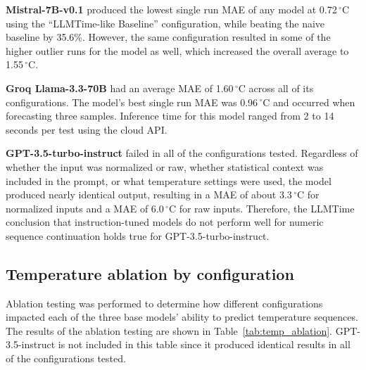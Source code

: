 \documentclass[11pt,a4paper]{article}
\begin{document}
\textbf{Mistral-7B-v0.1} produced the lowest single run MAE of any model at 0.72\,$^{\circ}$C using the ``LLMTime-like Baseline'' configuration, while beating the naive baseline by 35.6\%. However, the same configuration resulted in some of the higher outlier runs for the model as well, which increased the overall average to 1.55\,$^{\circ}$C.

\textbf{Groq Llama-3.3-70B} had an average MAE of 1.60\,$^{\circ}$C across all of its configurations. The model's best single run MAE was 0.96\,$^{\circ}$C and occurred when forecasting three samples. Inference time for this model ranged from 2 to 14 seconds per test using the cloud API.

\textbf{GPT-3.5-turbo-instruct} failed in all of the configurations tested. Regardless of whether the input was normalized or raw, whether statistical context was included in the prompt, or what temperature settings were used, the model produced nearly identical output, resulting in a MAE of about 3.3\,$^{\circ}$C for normalized inputs and a MAE of 6.0\,$^{\circ}$C for raw inputs. Therefore, the LLMTime conclusion that instruction-tuned models do not perform well for numeric sequence continuation holds true for GPT-3.5-turbo-instruct.

\subsection{Temperature ablation by configuration}

Ablation testing was performed to determine how different configurations impacted each of the three base models' ability to predict temperature sequences. The results of the ablation testing are shown in Table~\ref{tab:temp_ablation}. GPT-3.5-instruct is not included in this table since it produced identical results in all of the configurations tested.
\end{document}

